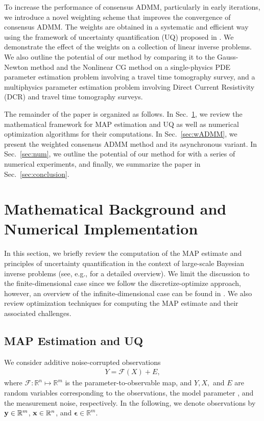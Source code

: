 \documentclass[11pt]{article}          %
\newcommand{\bbR}{\mathbb{R}}
\newcommand{\bfy}{{\bf  y}}
\newcommand{\bfx}{{\bf  x}}
\newcommand{\bfepsilon}{\boldsymbol \epsilon}
\begin{document}
To increase the performance of consensus ADMM, particularly in early iterations, we introduce a novel weighting scheme that improves the convergence of consensus ADMM. The weights are obtained in a systematic and efficient way using the framework of uncertainty quantification (UQ) proposed in \cite{flath2011fast}. We demonstrate the effect of the weights on a collection of linear inverse problems. We also outline the potential of our method by comparing it to the Gauss-Newton method \cite{haber2014computational} and the Nonlinear CG method \cite{hager2005new} on a single-physics PDE parameter estimation problem involving a travel time tomography survey, and a multiphysics parameter estimation problem involving Direct Current Resistivity (DCR) and travel time tomography \cite{treister2016fast} surveys. 

The remainder of the paper is organized as follows. In Sec.~\ref{sec:MathBackground}, we review the mathematical framework for MAP estimation and UQ as well as numerical optimization algorithms for their computations. In Sec.~\ref{sec:wADMM}, we present the weighted consensus ADMM method and its asynchronous variant. In Sec.~\ref{sec:num},  we outline the potential of our method for with a series of numerical experiments, and finally, we summarize the paper in Sec.~\ref{sec:conclusion}.

\section{Mathematical Background and Numerical Implementation} \label{sec:MathBackground}
In this section, we briefly review the computation of the MAP estimate and principles of uncertainty quantification in the context of large-scale Bayesian inverse problems (see, e.g., \cite{calvetti2006large,stuart2010inverse} for a detailed overview). We limit the discussion to the finite-dimensional case since we follow the discretize-optimize approach, however, an overview of the infinite-dimensional case can be found in \cite{stuart2010inverse}. We also review optimization techniques for computing the MAP estimate and their associated challenges. 

\subsection{MAP Estimation and UQ}
We consider additive noise-corrupted observations
\begin{align}
  Y = \mathcal{F}(X) + E,
\end{align}
where $\mathcal{F} \colon \bbR^n \mapsto \bbR^{m}$ is the parameter-to-observable map, and $Y, X,$ and $E$ are random variables corresponding to the observations, the model parameter , and the measurement noise, respectively. In the following, we denote observations by $\bfy \in \bbR^{m}$,  $\bfx \in \bbR^n$, and $\bfepsilon \in \bbR^m$.
\end{document}
